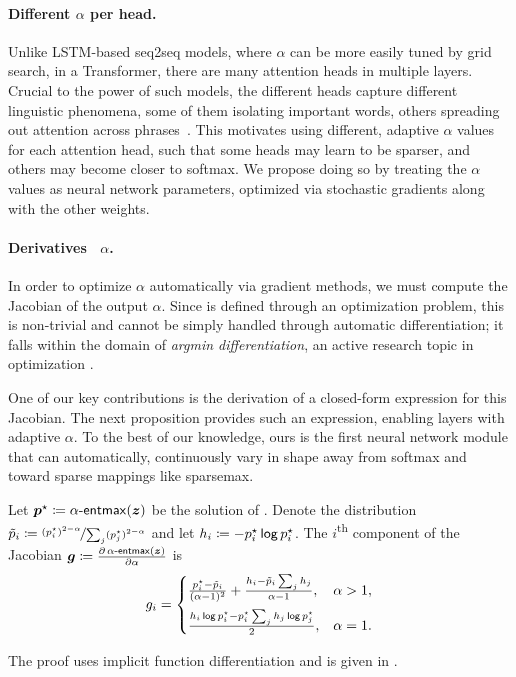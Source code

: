 \paragraph*{Different {\boldmath $\alpha$} per head.}
Unlike LSTM-based seq2seq models, where $\alpha$ can be more easily
tuned by grid search, in a Transformer, there are many attention
heads in multiple layers. Crucial to the power of such models, the
different heads capture different linguistic phenomena, some of them
isolating important words, others spreading out attention across
phrases~\citep[Figure~5]{vaswani2017attention}. This motivates using
different, adaptive $\alpha$ values for each attention head, such
that some heads may learn to be sparser, and others may become closer
to softmax. We propose doing so by treating the $\alpha$ values as
neural network parameters, optimized via stochastic gradients along
with the other weights.

\paragraph*{Derivatives \wrt~{\boldmath $\alpha$}.}
In order to optimize $\alpha$ automatically via gradient methods, we
must compute the Jacobian of the \entmaxtext output \wrt $\alpha$.
Since \entmaxtext is defined through an optimization problem, this is
non-trivial and cannot be simply handled through automatic
differentiation; it falls within the domain of \emph{argmin
    differentiation}, an active research topic in optimization
\citep{gould,optnet}.

One of our key contributions is the derivation of a closed-form
expression for this Jacobian. The next proposition provides
such an expression, enabling \entmaxtext layers with
adaptive $\alpha$. To the best of our knowledge, ours is the first
neural network module that can automatically, continuously vary in
shape away from softmax and toward sparse mappings like sparsemax.

\begin{proposition}\label{prop:grad_alpha}%
    Let $\bm{p}^\star \coloneqq \mathop{\mathsf{\alpha}\textnormal{-}\mathsf{entmax}}(\bm{z})$ be the solution of
    .
    Denote the distribution $\tilde{p}_i \coloneqq \nicefrac{(p_i^\star)^{2 - \alpha}}{
            \sum_j(p_j^\star)^{2-\alpha}}$ and let
    $h_i \coloneqq -p^\star_i \operatorname*{\mathsf{log}} p^\star_i$.
    The $i$\textsuperscript{th} component of the Jacobian
    $\bm{g} \coloneqq \frac{\partial \mathop{\mathsf{\alpha}\textnormal{-}\mathsf{entmax}}(\bm{z})}{\partial \alpha}$ is
    \begin{equation}\label{eq:final_gradient_alpha}
        g_i =%
        \begin{cases}
            \frac{p_i^{\star} - \tilde{\pp}_i}{(\alpha-1)^2} +
            \frac{h_i - \tilde{\pp}_i%
                \sum_j h_j%
            }{\alpha-1},                                                                  & \alpha > 1, \\[1.5ex]
            \frac{h_i \log \pp_i^{\star} - \pp_i^{\star} \sum_j h_j \log p_j^{\star}}{2}, & \alpha = 1.
        \end{cases}
    \end{equation}
\end{proposition}
\noindent%
The proof uses implicit function differentiation and is given in .

